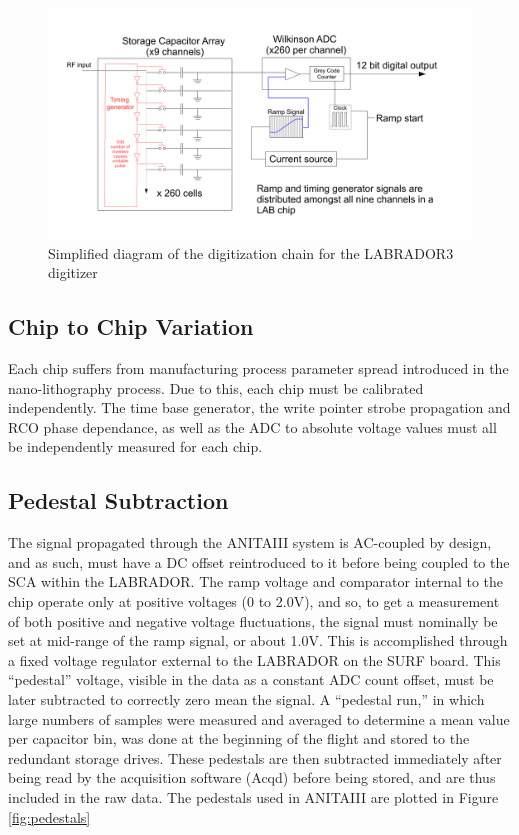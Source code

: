 \begin{figure}
	\includegraphics[width=\textwidth]{figures/LAB_Digitization}
	\caption{Simplified diagram of the digitization chain for the LABRADOR3 digitizer}
	\label{fig:Lab_Digitization}
\end{figure}	
		
	\subsection{Chip to Chip Variation}
		Each chip suffers from manufacturing process parameter spread introduced in the nano-lithography process.  Due to this, each chip must be calibrated independently.  The time base generator, the write pointer strobe propagation and RCO phase dependance, as well as the ADC to absolute voltage values must all be independently measured for each chip. 

	\subsection{Pedestal Subtraction}
		The signal propagated through the ANITAIII system is AC-coupled by design, and as such, must have a DC offset reintroduced to it before being coupled to the SCA within the LABRADOR.  The ramp voltage and comparator internal to the chip operate only at positive voltages (0 to 2.0V), and so, to get a measurement of both positive and negative voltage fluctuations, the signal must nominally be set at mid-range of the ramp signal, or about 1.0V.  This is accomplished through a fixed voltage regulator external to the LABRADOR on the SURF board.  This ``pedestal'' voltage, visible in the data as a constant ADC count offset, must be later subtracted to correctly zero mean the signal.  A ``pedestal run,'' in which large numbers of samples were measured and averaged to determine a mean value per capacitor bin, was done at the beginning of the flight and stored to the redundant storage drives.  These pedestals are then subtracted immediately after being read by the acquisition software (Acqd) before being stored, and are thus included in the raw data.  The pedestals used in ANITAIII are plotted in Figure \ref{fig:pedestals}
		
